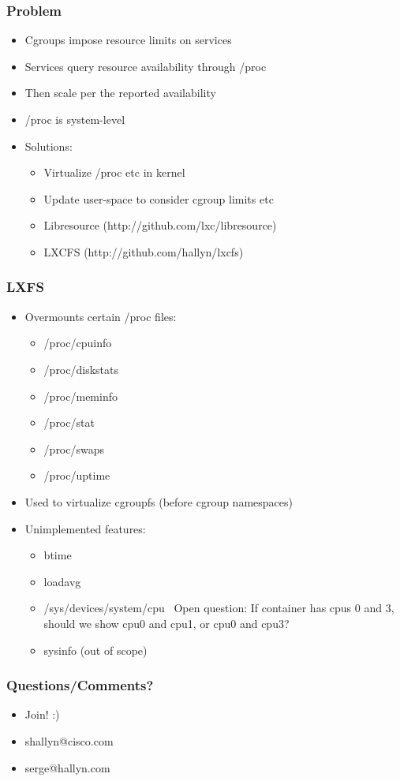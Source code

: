 \documentclass{beamer}
\title[Exposing resource limits to containers with LXCFS]{} %
\author{Serge Hallyn} %
\institute{Cisco}
\date{\today} %
\begin{document}
\begin{frame}
\titlepage %
\end{frame}

\begin{frame}[fragile]
\frametitle{Problem}
	\begin{itemize}
	\item Cgroups impose resource limits on services
	\item Services query resource availability through /proc
	\item Then scale per the reported availability
	\item /proc is system-level
\pause
	\item Solutions:
		\begin{itemize}
		\item Virtualize /proc etc in kernel
		\item Update user-space to consider cgroup limits etc
		\item Libresource (http://github.com/lxc/libresource)
		\item LXCFS (http://github.com/hallyn/lxcfs)
		\end{itemize}
	\end{itemize}
\end{frame}

\begin{frame}[fragile]
\frametitle{LXFS}
	\begin{itemize}
	\item Overmounts certain /proc files:
		\begin{itemize}
		\item /proc/cpuinfo
		\item /proc/diskstats
		\item /proc/meminfo
		\item /proc/stat
		\item /proc/swaps
		\item /proc/uptime
		\end{itemize}
	\item Used to virtualize cgroupfs (before cgroup namespaces)
\pause
	\item Unimplemented features:
		\begin{itemize}
		\item btime
		\item loadavg
		\item /sys/devices/system/cpu \
Open question: If container has cpus 0 and 3, should we show
cpu0 and cpu1, or cpu0 and cpu3?
		\item sysinfo (out of scope)
		\end{itemize}
	\end{itemize}
\end{frame}

\begin{frame}
\frametitle{Questions/Comments?}
\begin{itemize}
\item Join! :)
\item shallyn@cisco.com
\item serge@hallyn.com
\end{itemize}
\end{frame}

\end{document}
